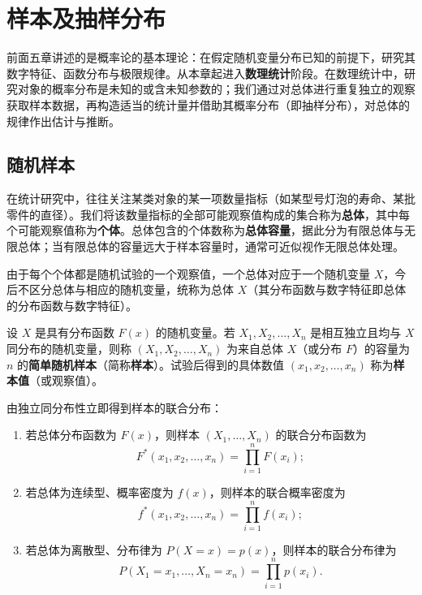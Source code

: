 %
%

\chapter{样本及抽样分布}
\label{ch:sampling-distributions}

前面五章讲述的是概率论的基本理论：在假定随机变量分布已知的前提下，研究其数字特征、函数分布与极限规律。从本章起进入\textbf{数理统计}阶段。在数理统计中，研究对象的概率分布是未知的或含未知参数的；我们通过对总体进行重复独立的观察获取样本数据，再构造适当的统计量并借助其概率分布（即抽样分布），对总体的规律作出估计与推断。

\section{随机样本}
\label{sec:random-sample}

在统计研究中，往往关注某类对象的某一项数量指标（如某型号灯泡的寿命、某批零件的直径）。我们将该数量指标的全部可能观察值构成的集合称为\textbf{总体}，其中每个可能观察值称为\textbf{个体}。总体包含的个体数称为\textbf{总体容量}，据此分为有限总体与无限总体；当有限总体的容量远大于样本容量时，通常可近似视作无限总体处理。

由于每个个体都是随机试验的一个观察值，一个总体对应于一个随机变量 $X$，今后不区分总体与相应的随机变量，统称为总体 $X$（其分布函数与数字特征即总体的分布函数与数字特征）。

\begin{definition}[简单随机样本]
\label{def:simple-random-sample}
设 $X$ 是具有分布函数 $F(x)$ 的随机变量。若 $X_1,X_2,\ldots,X_n$ 是相互独立且均与 $X$ 同分布的随机变量，则称 $(X_1,X_2,\ldots,X_n)$ 为来自总体 $X$（或分布 $F$）的容量为 $n$ 的\textbf{简单随机样本}（简称\textbf{样本}）。试验后得到的具体数值 $(x_1,x_2,\ldots,x_n)$ 称为\textbf{样本值}（或观察值）。
\end{definition}

由独立同分布性立即得到样本的联合分布：
\begin{enumerate}
  \item 若总体分布函数为 $F(x)$，则样本 $(X_1,\ldots,X_n)$ 的联合分布函数为
  \[
    F^*(x_1,x_2,\ldots,x_n)=\prod_{i=1}^{n}F(x_i);
  \]
  \item 若总体为连续型、概率密度为 $f(x)$，则样本的联合概率密度为
  \[
    f^*(x_1,x_2,\ldots,x_n)=\prod_{i=1}^{n}f(x_i);
  \]
  \item 若总体为离散型、分布律为 $P(X=x)=p(x)$，则样本的联合分布律为
  \[
    P(X_1=x_1,\ldots,X_n=x_n)=\prod_{i=1}^{n}p(x_i).
  \]
\end{enumerate}

